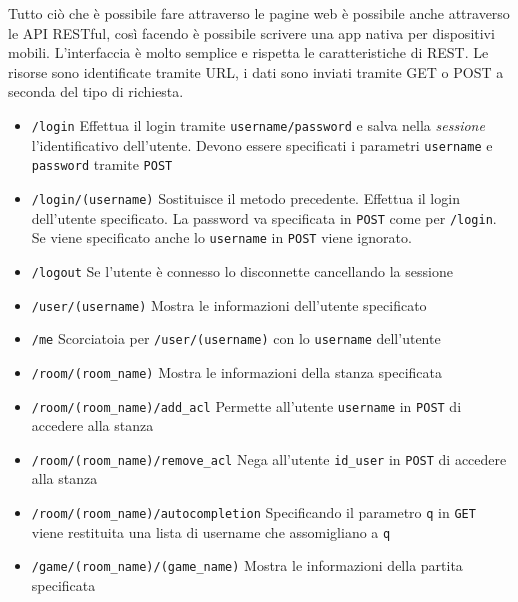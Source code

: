 Tutto ciò che è possibile fare attraverso le pagine web è possibile anche attraverso le API RESTful, così facendo è possibile scrivere una app nativa per dispositivi mobili. L'interfaccia è molto semplice e rispetta le caratteristiche di REST. Le risorse sono identificate tramite URL, i dati sono inviati tramite GET o POST a seconda del tipo di richiesta.

\begin{itemize}[noitemsep,nolistsep]
	\item \texttt{/login} Effettua il login tramite \texttt{username/password} e salva nella \emph{sessione} l'identificativo dell'utente. Devono essere specificati i parametri \texttt{username} e \texttt{password} tramite \texttt{POST}
	
	\item \texttt{/login/(username)} Sostituisce il metodo precedente. Effettua il login dell'utente specificato. La password va specificata in \texttt{POST} come per \texttt{/login}. Se viene specificato anche lo \texttt{username} in \texttt{POST} viene ignorato.
	
	\item \texttt{/logout} Se l'utente è connesso lo disconnette cancellando la sessione
	
	\item \texttt{/user/(username)} Mostra le informazioni dell'utente specificato
	
	\item \texttt{/me} Scorciatoia per \texttt{/user/(username)} con lo \texttt{username} dell'utente 
	
	\item \texttt{/room/(room\_name)} Mostra le informazioni della stanza specificata
	
	\item \texttt{/room/(room\_name)/add\_acl} Permette all'utente \texttt{username} in \texttt{POST} di accedere alla stanza
	
	\item \texttt{/room/(room\_name)/remove\_acl} Nega all'utente \texttt{id\_user} in \texttt{POST} di accedere alla stanza
	
	\item \texttt{/room/(room\_name)/autocompletion} Specificando il parametro \texttt{q} in \texttt{GET} viene restituita una lista di username che assomigliano a \texttt{q}
	
	\item \texttt{/game/(room\_name)/(game\_name)} Mostra le informazioni della partita specificata
	

\end{itemize}

